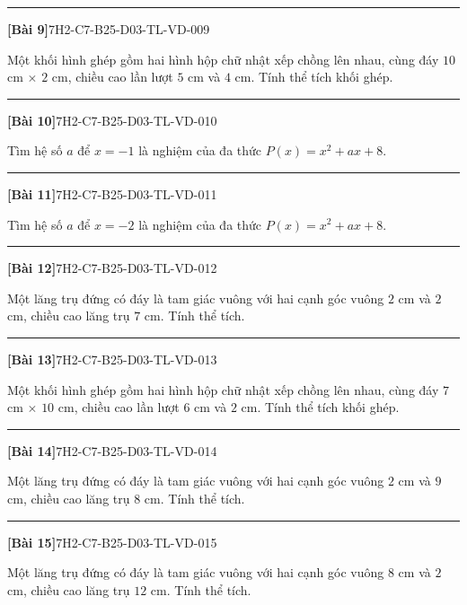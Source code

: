 \documentclass[12pt,a4paper]{article}
\newif\ifloigiai
\newenvironment{cauhoi}[2]{%
  \par\medskip\noindent\rule{\textwidth}{0.4pt}\par\nopagebreak
  \noindent\textbf{[#1]}\hfill{\scriptsize\ttfamily #2}\par\nopagebreak\smallskip}{\par}
\newcommand{\loigiai}[1]{\ifloigiai\par\smallskip\noindent\textit{Lời giải.} #1\par\fi}
\begin{document}
\begin{cauhoi}{Bài 9}{7H2-C7-B25-D03-TL-VD-009}
Một khối hình ghép gồm hai hình hộp chữ nhật xếp chồng lên nhau, cùng đáy $10$ cm $\times$ $2$ cm, chiều cao lần lượt $5$ cm và $4$ cm. Tính thể tích khối ghép.
\loigiai{Thể tích hai khối là $10\cdot 2\cdot 5=100$ và $10\cdot 2\cdot 4=80$ ($\text{cm}^3$). Thể tích khối ghép là $100+80=180$ ($\text{cm}^3$).}
\end{cauhoi}
\begin{cauhoi}{Bài 10}{7H2-C7-B25-D03-TL-VD-010}
Tìm hệ số $a$ để $x=-1$ là nghiệm của đa thức $P(x)=x^{2}+ax+8$.
\loigiai{$x=-1$ là nghiệm nên $P(-1)=0$: $1-1\cdot a+8=0$ nên $-a=-9$, suy ra $a=9$.}
\end{cauhoi}
\begin{cauhoi}{Bài 11}{7H2-C7-B25-D03-TL-VD-011}
Tìm hệ số $a$ để $x=-2$ là nghiệm của đa thức $P(x)=x^{2}+ax+8$.
\loigiai{$x=-2$ là nghiệm nên $P(-2)=0$: $4-2\cdot a+8=0$ nên $-2a=-12$, suy ra $a=6$.}
\end{cauhoi}
\begin{cauhoi}{Bài 12}{7H2-C7-B25-D03-TL-VD-012}
Một lăng trụ đứng có đáy là tam giác vuông với hai cạnh góc vuông $2$ cm và $2$ cm, chiều cao lăng trụ $7$ cm. Tính thể tích.
\loigiai{Diện tích đáy là $\dfrac{2\cdot 2}{2}=2$ ($\text{cm}^2$). Thể tích là $2\cdot 7=14$ ($\text{cm}^3$).}
\end{cauhoi}
\begin{cauhoi}{Bài 13}{7H2-C7-B25-D03-TL-VD-013}
Một khối hình ghép gồm hai hình hộp chữ nhật xếp chồng lên nhau, cùng đáy $7$ cm $\times$ $10$ cm, chiều cao lần lượt $6$ cm và $2$ cm. Tính thể tích khối ghép.
\loigiai{Thể tích hai khối là $7\cdot 10\cdot 6=420$ và $7\cdot 10\cdot 2=140$ ($\text{cm}^3$). Thể tích khối ghép là $420+140=560$ ($\text{cm}^3$).}
\end{cauhoi}
\begin{cauhoi}{Bài 14}{7H2-C7-B25-D03-TL-VD-014}
Một lăng trụ đứng có đáy là tam giác vuông với hai cạnh góc vuông $2$ cm và $9$ cm, chiều cao lăng trụ $8$ cm. Tính thể tích.
\loigiai{Diện tích đáy là $\dfrac{2\cdot 9}{2}=9$ ($\text{cm}^2$). Thể tích là $9\cdot 8=72$ ($\text{cm}^3$).}
\end{cauhoi}
\begin{cauhoi}{Bài 15}{7H2-C7-B25-D03-TL-VD-015}
Một lăng trụ đứng có đáy là tam giác vuông với hai cạnh góc vuông $8$ cm và $2$ cm, chiều cao lăng trụ $12$ cm. Tính thể tích.
\loigiai{Diện tích đáy là $\dfrac{8\cdot 2}{2}=8$ ($\text{cm}^2$). Thể tích là $8\cdot 12=96$ ($\text{cm}^3$).}
\end{cauhoi}
\end{document}
